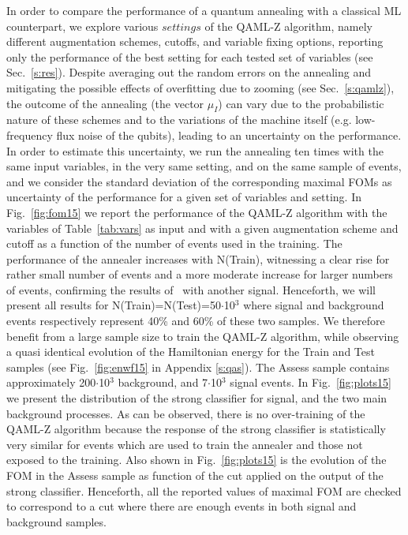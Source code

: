 \documentclass{article}
\begin{document}
In order to compare the performance of a quantum annealing with a 
classical ML counterpart, we explore various $settings$ of the QAML-Z 
algorithm, namely different augmentation schemes, cutoffs, and variable 
fixing options, reporting only the performance of the best setting for 
each tested set of variables (see Sec.~\ref{s:res}). Despite averaging 
out the random errors on the annealing and mitigating the possible effects 
of overfitting due to zooming (see Sec.~\ref{s:qamlz}), the outcome of 
the annealing (the vector $\mu_I$) can vary due to the probabilistic 
nature of these schemes and to the variations of the machine itself (e.g. 
low-frequency flux noise of the qubits), leading to an uncertainty on the 
performance. In order to estimate this uncertainty, we run the annealing 
ten times with the same input variables, in the very same setting, and on 
the same sample of events, and we consider the standard deviation of the 
corresponding maximal FOMs as uncertainty of the performance for a given 
set of variables and setting. In Fig.~\ref{fig:fom15} we report the 
performance of the QAML-Z algorithm with the variables of 
Table~\ref{tab:vars} as input and with a given augmentation scheme and 
cutoff as a function of the number of events used in the training. The 
performance of the annealer increases with N(Train), witnessing a clear 
rise for rather small number of events and a more moderate increase for 
larger numbers of events, confirming the results of~\cite{nature} with 
another signal. Henceforth, we will present all results for 
N(Train)=N(Test)=50$\cdot$10$^3$ where signal and background events 
respectively represent 40\% and 60\% of these two samples. We therefore 
benefit from a large sample size to train the QAML-Z algorithm, while 
observing a quasi identical evolution of the Hamiltonian energy for the 
Train and Test samples (see Fig.~\ref{fig:enwf15} in Appendix 
\ref{s:qas}). The Assess sample contains approximately 200$\cdot$10$^3$ 
background, and 7$\cdot$10$^3$ signal events. In Fig.~\ref{fig:plots15} we 
present the distribution of the strong classifier for signal, and the two 
main background processes. As can be observed, there is no over-training 
of the QAML-Z algorithm because the response of the strong classifier is 
statistically very similar for events which are used to train the annealer 
and those not exposed to the training. Also shown in 
Fig.~\ref{fig:plots15} is the evolution of the FOM in the Assess sample as 
function of the cut applied on the output of the strong classifier. 
Henceforth, all the reported values of maximal FOM are checked to 
correspond to a cut where there are enough events in both signal and 
background samples.
\end{document}
